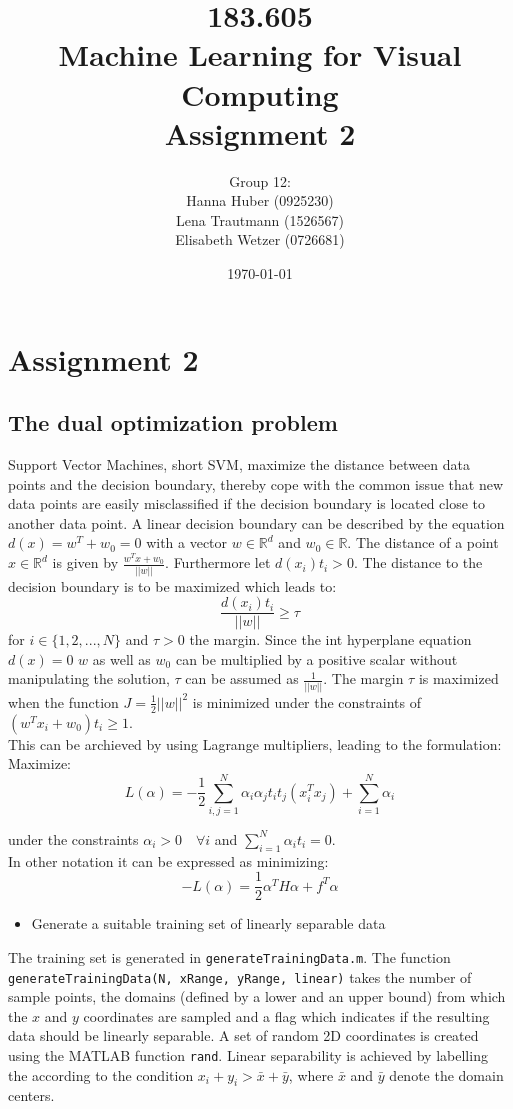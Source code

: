 \documentclass[a4]{article}
\title{\bf 183.605 \\ Machine Learning for Visual Computing \\ Assignment 2}
\author{Group 12: \\
	Hanna Huber (0925230) \\ Lena Trautmann (1526567) \\ Elisabeth Wetzer (0726681)}
\date{\today}
\begin{document}
\maketitle
\noindent

\section{Assignment 2}
\subsection{The dual optimization problem}
Support Vector Machines, short SVM, maximize the distance between data points and the decision boundary, thereby cope with the common issue that new data points are easily misclassified if the decision boundary is located close to another data point. A linear decision boundary can be described by the equation $d(x)=w^T+w_0=0$ with a vector $w \in \mathbb{R}^d$ and $w_0 \in \mathbb{R}$. The distance of a point $x \in \mathbb{R}^d$ is given by $\frac{w^Tx+w_0}{||w||}$. Furthermore let $d(x_i)t_i>0$.
The distance to the decision boundary is to be maximized which leads to:
$$\frac{d(x_i)t_i}{||w||} \geq \tau$$
for $i \in \{1,2,..., N\}$ and $\tau >0$ the margin. Since the int hyperplane equation $d(x)=0$ $w$ as well as $w_0$ can be multiplied by a positive scalar without manipulating the solution, $\tau$ can be assumed as $\frac{1}{||w||}$.
The margin $\tau$ is maximized when the function $J=\frac{1}{2} ||w||^2$ is minimized under the constraints of $(w^Tx_i+w_0)t_i \geq1$.\\
This can be archieved by using Lagrange multipliers, leading to the formulation:\\
Maximize:
 $$L(\alpha)=-\frac{1}{2} \sum_{i,j=1}^N \alpha_i \alpha_j t_i t_j (x_i^T x_j) + \sum_{i=1}^N \alpha_i$$
 
 under the constraints $\alpha_i >0 \quad \forall i$ and $\sum_{i=1}^N \alpha_i t_i =0$.\\
 
 In other notation it can be expressed as minimizing:
 $$-L(\alpha)=\frac{1}{2} \alpha^T H \alpha + f^T \alpha$$

\begin{itemize}
\item Generate a suitable training set of linearly separable data
\end{itemize}
The training set is generated in \texttt{generateTrainingData.m}. The function \texttt{generateTrainingData(N, xRange, yRange, linear)} takes the number of sample points, the domains (defined by a lower and an upper bound) from which the $x$ and $y$ coordinates are sampled and a flag which indicates if the resulting data should be linearly separable. A set of random 2D coordinates is created using the MATLAB function \texttt{rand}. Linear separability is achieved by labelling the according to the condition $ x_i + y_i > \bar{x} + \bar{y}$, where $\bar{x}$ and $\bar{y}$ denote the domain centers.
\end{document}
